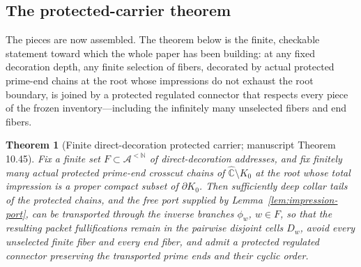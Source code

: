 \documentclass[11pt,reqno]{amsart}
\newtheorem{theorem}{Theorem}[section]
\theoremstyle{definition}
\theoremstyle{remark}
\newcommand{\Chat}{\widehat{\mathbb C}}
\begin{document}
\subsection{The protected-carrier theorem}\label{subsec:F-carrier}

The pieces are now assembled.  The theorem below is the finite,
checkable statement toward which the whole paper has been building: at
any fixed decoration depth, any finite selection of fibers, decorated by
actual protected prime-end chains at the root whose impressions do not
exhaust the root boundary, is joined by a protected regulated connector
that respects every piece of the frozen inventory---including the
infinitely many unselected fibers and end fibers.

\begin{theorem}[Finite direct-decoration protected carrier; manuscript
Theorem 10.45]\label{thm:carrier}
Fix a finite set $F\subset\mathcal A^{<\mathbb N}$ of direct-decoration
addresses, and fix finitely many actual protected prime-end crosscut
chains of $\Chat\setminus K_0$ at the root whose total impression is a
proper compact subset of $\partial K_0$.  Then sufficiently deep collar tails of the protected
chains, and the free port supplied by
Lemma~\ref{lem:impression-port}, can be transported through the inverse
branches $\phi_w$, $w\in F$, so that the resulting packet fullifications
remain in the pairwise disjoint cells $D_w$, avoid every unselected
finite fiber and every end fiber, and admit a protected regulated
connector preserving the transported prime ends and their cyclic order.
\end{theorem}
\end{document}
